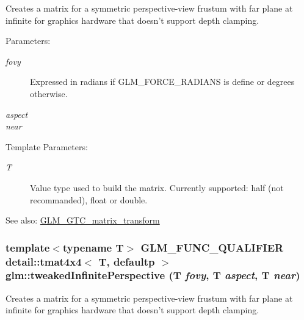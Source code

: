 Creates a matrix for a symmetric perspective-view frustum with far plane at infinite for graphics hardware that doesn't support depth clamping.

\begin{Desc}
\item[Parameters:]
\begin{description}
\item[{\em fovy}]Expressed in radians if GLM\_\-FORCE\_\-RADIANS is define or degrees otherwise. \item[{\em aspect}]\item[{\em near}]\end{description}
\end{Desc}
\begin{Desc}
\item[Template Parameters:]
\begin{description}
\item[{\em T}]Value type used to build the matrix. Currently supported: half (not recommanded), float or double. \end{description}
\end{Desc}
\begin{Desc}
\item[See also:]\hyperlink{group__gtc__matrix__transform}{GLM\_\-GTC\_\-matrix\_\-transform} \end{Desc}
\hypertarget{group__gtc__matrix__transform_ge918d92c6d1fc5c0f97ac96d66e90b6a}{
\subsubsection[tweakedInfinitePerspective]{\setlength{\rightskip}{0pt plus 5cm}template$<$typename T$>$ GLM\_\-FUNC\_\-QUALIFIER detail::tmat4x4$<$ T, defaultp $>$ glm::tweakedInfinitePerspective (T {\em fovy}, \/  T {\em aspect}, \/  T {\em near})}}
\label{group__gtc__matrix__transform_ge918d92c6d1fc5c0f97ac96d66e90b6a}


Creates a matrix for a symmetric perspective-view frustum with far plane at infinite for graphics hardware that doesn't support depth clamping.

